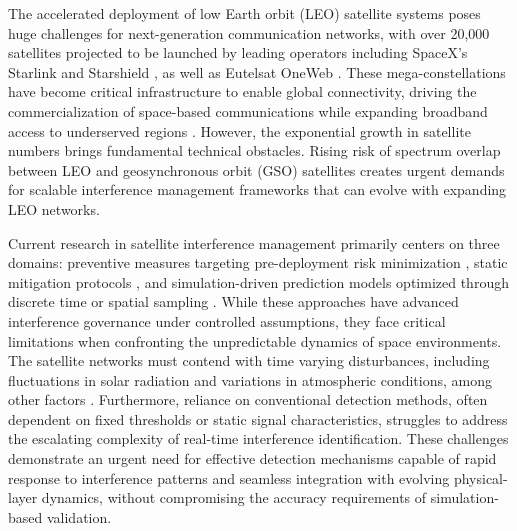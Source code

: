 \documentclass[conference]{IEEEtran}
\begin{document}
The accelerated deployment of low Earth orbit (LEO) satellite systems poses huge challenges for next-generation communication networks, with over 20,000 satellites projected to be launched by leading operators including SpaceX's Starlink\cite{starlink} and Starshield \cite{spacex_starshield}, as well as Eutelsat OneWeb \cite{oneweb}. These mega-constellations have become critical infrastructure to enable global connectivity, driving the commercialization of space-based communications while expanding broadband access to underserved regions \cite{reddyLowEarthOrbit2023}. However, the exponential growth in satellite numbers brings fundamental technical obstacles. Rising risk of spectrum overlap between LEO and geosynchronous orbit (GSO) satellites creates urgent demands for scalable interference management frameworks that can evolve with expanding LEO networks.

Current research in satellite interference management primarily centers on three domains: preventive measures targeting pre-deployment risk minimization \cite{sharmaInlineInterferenceMitigation2016, liOptimalBeamPower2019}, static mitigation protocols \cite{wangCoFrequencyInterferenceAnalysis2020, zhangSpectralCoexistenceLEO2018}, and simulation-driven prediction models optimized through discrete time or spatial sampling \cite{wangCoFrequencyInterferenceAnalysis2020}. While these approaches have advanced interference governance under controlled assumptions, they face critical limitations when confronting the unpredictable dynamics of space environments. The satellite networks must contend with time varying disturbances, including fluctuations in solar radiation and variations in atmospheric conditions, among other factors \cite{facskoSpaceWeatherEffects2023}. Furthermore, reliance on conventional detection methods, often dependent on fixed thresholds or static signal characteristics, struggles to address the escalating complexity of real-time interference identification. These challenges demonstrate an urgent need for effective detection mechanisms capable of rapid response to interference patterns and seamless integration with evolving physical-layer dynamics, without compromising the accuracy requirements of simulation-based validation.
\end{document}
